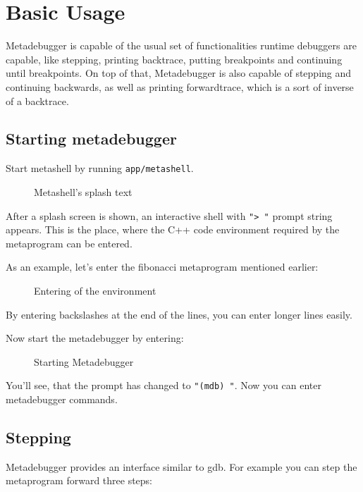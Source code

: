 \section{Basic Usage\cite{github}}

Metadebugger is capable of the usual set of functionalities runtime debuggers
are capable, like stepping, printing backtrace, putting breakpoints and
continuing until breakpoints. On top of that, Metadebugger is also capable of
stepping and continuing backwards, as well as printing forwardtrace, which is
a sort of inverse of a backtrace.

\subsection{Starting metadebugger}

Start metashell by running \texttt{app/metashell}.

\begin{figure}[H]
    
    \caption{Metashell's splash text}
\end{figure}

\noindent
After a splash screen is shown, an interactive shell with \texttt{"> "}
prompt string appears. This is the place, where the C++ code environment
required by the metaprogram can be entered.

As an example, let's enter the fibonacci metaprogram mentioned earlier:

\begin{figure}[H]
    
    \caption{Entering of the environment}
\end{figure}

\noindent
By entering backslashes at the end of the lines, you can enter longer lines
easily.

Now start the metadebugger by entering:

\begin{figure}[H]
    
    \caption{Starting Metadebugger}
\end{figure}

\noindent
You'll see, that the prompt has changed to \texttt{"(mdb) "}. Now you can enter
metadebugger commands.

\subsection{Stepping}

Metadebugger provides an interface similar to gdb\cite{gdb}. For example you
can step the metaprogram forward three steps:


